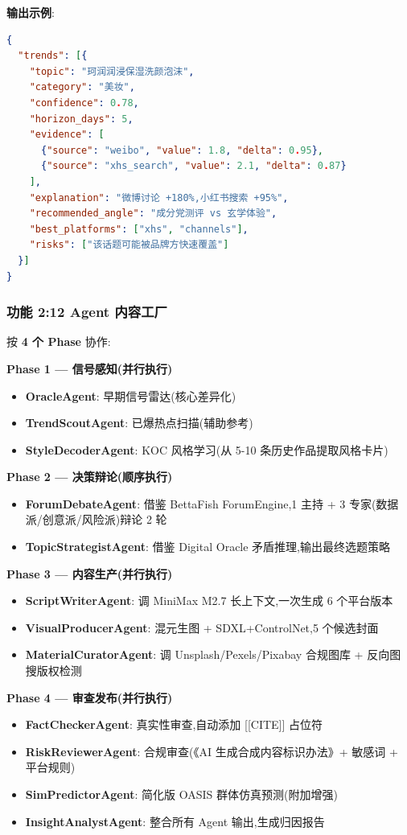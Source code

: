 \textbf{输出示例}:
\begin{lstlisting}[language=json, caption=Oracle 报告示例]
{
  "trends": [{
    "topic": "珂润润浸保湿洗颜泡沫",
    "category": "美妆",
    "confidence": 0.78,
    "horizon_days": 5,
    "evidence": [
      {"source": "weibo", "value": 1.8, "delta": 0.95},
      {"source": "xhs_search", "value": 2.1, "delta": 0.87}
    ],
    "explanation": "微博讨论 +180%,小红书搜索 +95%",
    "recommended_angle": "成分党测评 vs 玄学体验",
    "best_platforms": ["xhs", "channels"],
    "risks": ["该话题可能被品牌方快速覆盖"]
  }]
}
\end{lstlisting}

\subsubsection{功能 2:12 Agent 内容工厂}

按 \textbf{4 个 Phase} 协作:

\textbf{Phase 1 — 信号感知(并行执行)}
\begin{itemize}
\item \textbf{OracleAgent}: 早期信号雷达(核心差异化)
\item \textbf{TrendScoutAgent}: 已爆热点扫描(辅助参考)
\item \textbf{StyleDecoderAgent}: KOC 风格学习(从 5-10 条历史作品提取风格卡片)
\end{itemize}

\textbf{Phase 2 — 决策辩论(顺序执行)}
\begin{itemize}
\item \textbf{ForumDebateAgent}: 借鉴 BettaFish ForumEngine,1 主持 + 3 专家(数据派/创意派/风险派)辩论 2 轮
\item \textbf{TopicStrategistAgent}: 借鉴 Digital Oracle 矛盾推理,输出最终选题策略
\end{itemize}

\textbf{Phase 3 — 内容生产(并行执行)}
\begin{itemize}
\item \textbf{ScriptWriterAgent}: 调 MiniMax M2.7 长上下文,一次生成 6 个平台版本
\item \textbf{VisualProducerAgent}: 混元生图 + SDXL+ControlNet,5 个候选封面
\item \textbf{MaterialCuratorAgent}: 调 Unsplash/Pexels/Pixabay 合规图库 + 反向图搜版权检测
\end{itemize}

\textbf{Phase 4 — 审查发布(并行执行)}
\begin{itemize}
\item \textbf{FactCheckerAgent}: 真实性审查,自动添加 [[CITE]] 占位符
\item \textbf{RiskReviewerAgent}: 合规审查(《AI 生成合成内容标识办法》+ 敏感词 + 平台规则)
\item \textbf{SimPredictorAgent}: 简化版 OASIS 群体仿真预测(附加增强)
\item \textbf{InsightAnalystAgent}: 整合所有 Agent 输出,生成归因报告
\end{itemize}

